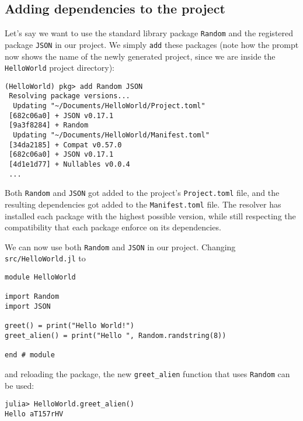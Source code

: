 \subsection{Adding dependencies to the project}



Let’s say we want to use the standard library package \texttt{Random} and the registered package \texttt{JSON} in our project. We simply \texttt{add} these packages (note how the prompt now shows the name of the newly generated project, since we are inside the \texttt{HelloWorld} project directory):




\begin{lstlisting}
(HelloWorld) pkg> add Random JSON
 Resolving package versions...
  Updating "~/Documents/HelloWorld/Project.toml"
 [682c06a0] + JSON v0.17.1
 [9a3f8284] + Random
  Updating "~/Documents/HelloWorld/Manifest.toml"
 [34da2185] + Compat v0.57.0
 [682c06a0] + JSON v0.17.1
 [4d1e1d77] + Nullables v0.0.4
 ...
\end{lstlisting}



Both \texttt{Random} and \texttt{JSON} got added to the project’s \texttt{Project.toml} file, and the resulting dependencies got added to the \texttt{Manifest.toml} file. The resolver has installed each package with the highest possible version, while still respecting the compatibility that each package enforce on its dependencies.



We can now use both \texttt{Random} and \texttt{JSON} in our project. Changing \texttt{src/HelloWorld.jl} to




\begin{lstlisting}
module HelloWorld

import Random
import JSON

greet() = print("Hello World!")
greet_alien() = print("Hello ", Random.randstring(8))

end # module
\end{lstlisting}



and reloading the package, the new \texttt{greet\_alien} function that uses \texttt{Random} can be used:




\begin{lstlisting}
julia> HelloWorld.greet_alien()
Hello aT157rHV
\end{lstlisting}



